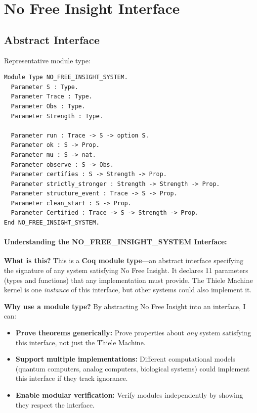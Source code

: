 \section{No Free Insight Interface}

\subsection{Abstract Interface}

Representative module type:
\begin{lstlisting}
Module Type NO_FREE_INSIGHT_SYSTEM.
  Parameter S : Type.
  Parameter Trace : Type.
  Parameter Obs : Type.
  Parameter Strength : Type.

  Parameter run : Trace -> S -> option S.
  Parameter ok : S -> Prop.
  Parameter mu : S -> nat.
  Parameter observe : S -> Obs.
  Parameter certifies : S -> Strength -> Prop.
  Parameter strictly_stronger : Strength -> Strength -> Prop.
  Parameter structure_event : Trace -> S -> Prop.
  Parameter clean_start : S -> Prop.
  Parameter Certified : Trace -> S -> Strength -> Prop.
End NO_FREE_INSIGHT_SYSTEM.
\end{lstlisting}

\paragraph{Understanding the NO\_FREE\_INSIGHT\_SYSTEM Interface:}

\textbf{What is this?} This is a \textbf{Coq module type}---an abstract interface specifying the signature of any system satisfying No Free Insight. It declares 11 parameters (types and functions) that any implementation must provide. The Thiele Machine kernel is one \textit{instance} of this interface, but other systems could also implement it.

\textbf{Why use a module type?} By abstracting No Free Insight into an interface, I can:
\begin{itemize}
    \item \textbf{Prove theorems generically:} Prove properties about \textit{any} system satisfying this interface, not just the Thiele Machine.
    \item \textbf{Support multiple implementations:} Different computational models (quantum computers, analog computers, biological systems) could implement this interface if they track ignorance.
    \item \textbf{Enable modular verification:} Verify modules independently by showing they respect the interface.
\end{itemize}

